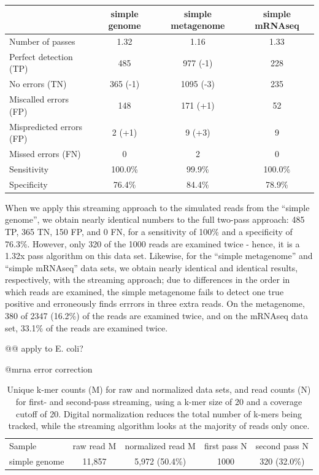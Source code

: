 \documentclass{article}
\begin{document}
\begin{table}
\begin{tabular}{|l|c||c||c|}
\hline
& simple genome & simple metagenome & simple mRNAseq \\
\hline
Number of passes & 1.32 & 1.16 & 1.33 \\
\hline
Perfect detection (TP) & 485 & 977 (-1) & 228 \\
No errors (TN) & 365 (-1) & 1095 (-3) & 235 \\
Miscalled errors (FP) & 148 & 171 (+1) & 52 \\
Mispredicted errors (FP) & 2 (+1) & 9 (+3) & 9 \\
Missed errors (FN) & 0 & 2 & 0 \\
\hline
Sensitivity & 100.0\% & 99.9\% & 100.0\% \\
Specificity & 76.4\% & 84.4\% & 78.9\% \\
\hline
\end{tabular}
\label{tab:spectra_streaming}
\end{table}

When we apply this streaming approach to the simulated reads from the
``simple genome'', we obtain nearly identical numbers to the full two-pass
approach: 485 TP, 365 TN, 150 FP, and 0 FN, for a sensitivity of 100\%
and a specificity of 76.3\%.  However, only 320 of the 1000 reads are
examined twice - hence, it is a 1.32x pass algorithm on this data set.
Likewise, for the ``simple metagenome''
and ``simple mRNAseq'' data sets, we obtain nearly identical and
identical results, respectively, with the streaming approach; due to
differences in the order in which reads are examined, the simple
metagenome fails to detect one true positive and erroneously finds
errrors in three extra reads.  On the metagenome, 380 of 2347 (16.2\%) of
the reads are examined twice, and on the mRNAseq data set, 33.1\% of the
reads are examined twice.






@@ apply to E. coli?


@mrna error correction

\begin{table}
\begin{tabular}{|l|c|c|c|c|}
\hline
Sample & raw read M & normalized read M & first pass N & second pass N \\
simple genome & 11,857 & 5,972 (50.4\%) & 1000 & 320 (32.0\%) \\
\hline
\end{tabular}
\label{tab:streaming_counts}

\caption{Unique k-mer counts (M) for raw and normalized data sets, and
read counts (N) for first- and second-pass streaming, using a k-mer size
of 20 and a coverage cutoff of 20.  Digital normalization reduces the
total number of k-mers being tracked, while the streaming algorithm
looks at the majority of reads only once.}
\end{table}
\end{document}
